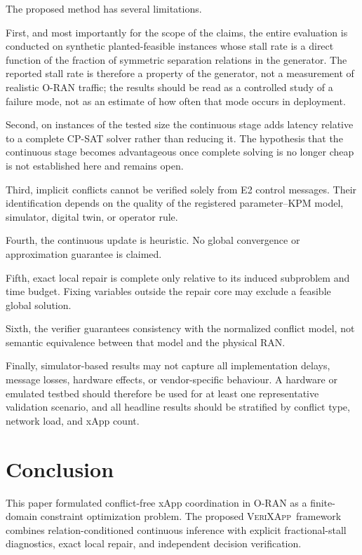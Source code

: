 \documentclass[pdflatex,sn-mathphys-num,iicol,oneside]{sn-jnl}
\newcommand{\method}{\textsc{VeriXApp}}
\begin{document}
The proposed method has several limitations.

First, and most importantly for the scope of the claims, the entire
evaluation is conducted on synthetic planted-feasible instances whose
stall rate is a direct function of the fraction of symmetric
separation relations in the generator. The reported stall rate is
therefore a property of the generator, not a measurement of realistic
O-RAN traffic; the results should be read as a controlled study of a
failure mode, not as an estimate of how often that mode occurs in
deployment.

Second, on instances of the tested size the continuous stage adds
latency relative to a complete CP-SAT solver rather than reducing it.
The hypothesis that the continuous stage becomes advantageous once
complete solving is no longer cheap is not established here and remains
open.

Third, implicit conflicts cannot be verified solely from E2 control
messages. Their identification depends on the quality of the
registered parameter--KPM model, simulator, digital twin, or operator
rule.

Fourth, the continuous update is heuristic. No global convergence or
approximation guarantee is claimed.

Fifth, exact local repair is complete only relative to its induced
subproblem and time budget. Fixing variables outside the repair core
may exclude a feasible global solution.

Sixth, the verifier guarantees consistency with the normalized
conflict model, not semantic equivalence between that model and the
physical RAN.

Finally, simulator-based results may not capture all implementation
delays, message losses, hardware effects, or vendor-specific
behaviour. A hardware or emulated testbed should therefore be used for
at least one representative validation scenario, and all headline
results should be stratified by conflict type, network load, and xApp
count.

\section{Conclusion}
\label{sec:conclusion}

This paper formulated conflict-free xApp coordination in O-RAN as a
finite-domain constraint optimization problem. The proposed
\method\ framework combines relation-conditioned continuous
inference with explicit fractional-stall diagnostics, exact local
repair, and independent decision verification.
\end{document}
